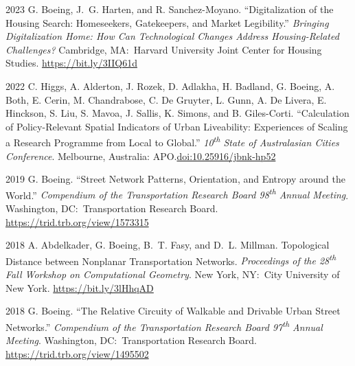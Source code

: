 \documentclass[11pt,letterpaper]{report}
\begin{document}
    \begin{tablist}

        \item[2023] \tab{}G. Boeing, J.~G. Harten, and R. Sanchez-Moyano. \enquote{Digitalization of the Housing Search: Homeseekers, Gatekeepers, and Market Legibility.} \textit{Bringing Digitalization Home: How Can Technological Changes Address Housing-Related Challenges?} Cambridge, MA:\ Harvard University Joint Center for Housing Studies. \href{https://bit.ly/3IIQ61d}{https://bit.ly/3IIQ61d}

        \item[2022] \tab{}C. Higgs, A. Alderton, J. Rozek, D. Adlakha, H. Badland, G. Boeing, A. Both, E. Cerin, M. Chandrabose, C. De Gruyter, L. Gunn, A. De Livera, E. Hinckson, S. Liu, S. Mavoa, J. Sallis, K. Simons, and B. Giles-Corti. \enquote{Calculation of Policy-Relevant Spatial Indicators of Urban Liveability: Experiences of Scaling a Research Programme from Local to Global.} \textit{10\textsuperscript{th} State of Australasian Cities Conference}. Melbourne, Australia: APO.\@ \href{https://doi.org/10.25916/jbnk-hp52}{doi:10.25916/jbnk-hp52}

        \item[2019] \tab{}G. Boeing. \enquote{Street Network Patterns, Orientation, and Entropy around the World.} \textit{Compendium of the Transportation Research Board 98\textsuperscript{th} Annual Meeting}. Washington, DC:\ Transportation Research Board. \href{https://trid.trb.org/view/1573315}{https://trid.trb.org/view/1573315}

        \item[2018] \tab{}A. Abdelkader, G. Boeing, B.~T. Fasy, and D.~L. Millman. Topological Distance between Nonplanar Transportation Networks. \textit{Proceedings of the 28\textsuperscript{th} Fall Workshop on Computational Geometry}. New York, NY:\ City University of New York. \href{https://bit.ly/3lHhqAD}{https://bit.ly/3lHhqAD}

        \item[2018] \tab{}G. Boeing. \enquote{The Relative Circuity of Walkable and Drivable Urban Street Networks.} \textit{Compendium of the Transportation Research Board 97\textsuperscript{th} Annual Meeting}. Washington, DC:\ Transportation Research Board. \href{https://trid.trb.org/view/1495502}{https://trid.trb.org/view/1495502}

    \end{tablist}
\end{document}
